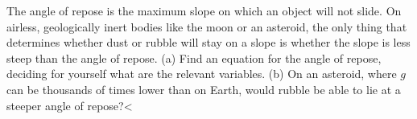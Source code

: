 The angle of repose is the maximum slope on which an
        object will not slide. On airless, geologically inert bodies
        like the moon or an asteroid, the only thing that determines
        whether dust or rubble will stay on a slope is whether the
        slope is less steep than the angle of repose. \hwendpart
        (a) Find an
        equation for the angle of repose, deciding for yourself what
        are the relevant variables.\hwendpart
         (b) On an asteroid, where $g$ can
        be thousands of times lower than on Earth, would rubble be
        able to lie at a steeper angle of repose?<%
